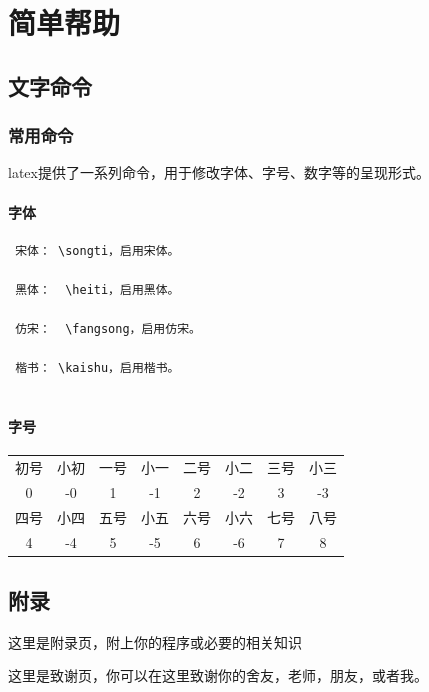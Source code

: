 \documentclass{LZUthesis}
\begin{document}
\chapter{简单帮助}
\section{文字命令}
 \subsection{常用命令}
 latex提供了一系列命令，用于修改字体、字号、数字等的呈现形式。
\subsubsection{字体}
\begin{verbatim}
 宋体： \songti，启用宋体。

 黑体：  \heiti，启用黑体。

 仿宋：  \fangsong，启用仿宋。

 楷书： \kaishu，启用楷书。


\end{verbatim}

\subsubsection{字号}

\begin{center}
 \begin{tabular}{cccccccc}
 \toprule
 初号 & 小初 & 一号 & 小一 & 二号 & 小二 & 三号 & 小三 \\
 0 & -0 & 1 & -1 & 2 & -2 & 3 & -3 \\
 \hline
 四号 & 小四 & 五号 & 小五 & 六号 & 小六 & 七号 & 八号 \\
 4 & -4 & 5 & -5 & 6 & -6 & 7 & 8 \\
 \bottomrule
 \end{tabular}
 \end{center}



\backmatter

\printbib




\Appendix

\section{附录}这里是附录页，附上你的程序或必要的相关知识\cite{silva2013brain}



\Thanks
这里是致谢页，你可以在这里致谢你的舍友，老师，朋友，或者我。





\Grade
\end{document}
